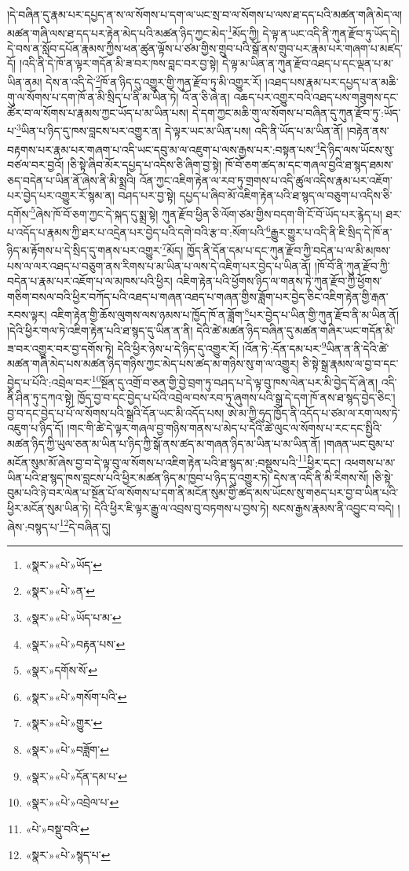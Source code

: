 །དེ་བཞིན་དུ་རྣམ་པར་དཔྱད་ན་ས་ལ་སོགས་པ་དག་ལ་ཡང་སྲ་བ་ལ་སོགས་པ་ལས་ཐ་དད་པའི་མཚན་གཞི་མེད་ལ། མཚན་གཞི་ལས་ཐ་དད་པར་རྟེན་མེད་པའི་མཚན་ཉིད་ཀྱང་མེད་\footnote{«སྣར་»«པེ་»ཡོད་}མོད་ཀྱི། དེ་ལྟ་ན་ཡང་འདི་ནི་ཀུན་རྫོབ་ཏུ་ཡོད་དེ། དེ་བས་ན་སློབ་དཔོན་རྣམས་ཀྱིས་ཕན་ཚུན་ལྟོས་པ་ཙམ་གྱིས་གྲུབ་པའི་སྒོ་ནས་གྲུབ་པར་རྣམ་པར་གཞག་པ་མཛད་དོ། །འདི་ནི་དེ་ཁོ་ན་ལྟར་གདོན་མི་ཟ་བར་ཁས་བླང་བར་བྱ་སྟེ། དེ་ལྟ་མ་ཡིན་ན་ཀུན་རྫོབ་འཐད་པ་དང་ལྡན་པ་མ་ཡིན་ནམ། དེས་ན་འདི་དེ་\footnote{«སྣར་»«པེ་»ན་}ཁོ་ན་ཉིད་དུ་འགྱུར་གྱི་ཀུན་རྫོབ་ཏུ་མི་འགྱུར་རོ། །འཐད་པས་རྣམ་པར་དཔྱད་པ་ན་མཆི་གུ་ལ་སོགས་པ་དག་ཁོ་ན་མི་སྲིད་པ་ནི་མ་ཡིན་ཏེ། འོ་ན་ཅི་ཞེ་ན། འཆད་པར་འགྱུར་བའི་འཐད་པས་གཟུགས་དང་ཚོར་བ་ལ་སོགས་པ་རྣམས་ཀྱང་ཡོད་པ་མ་ཡིན་པས། དེ་དག་ཀྱང་མཆི་གུ་ལ་སོགས་པ་བཞིན་དུ་ཀུན་རྫོབ་ཏུ་:ཡོད་པ་\footnote{«སྣར་»«པེ་»ཡོད་པ་མ་}ཡིན་པ་ཉིད་དུ་ཁས་བླངས་པར་འགྱུར་ན། དེ་ལྟར་ཡང་མ་ཡིན་པས། འདི་ནི་ཡོད་པ་མ་ཡིན་ནོ། །བརྟེན་ནས་བརྟགས་པར་རྣམ་པར་གཞག་པ་འདི་ཡང་དབུ་མ་ལ་འཇུག་པ་ལས་རྒྱས་པར་:བསྟན་པས་\footnote{«སྣར་»«པེ་»བརྟན་པས་}དེ་ཉིད་ལས་ཡོངས་སུ་བཙལ་བར་བྱའོ། །ཅི་སྟེ་ཞིབ་མོར་དཔྱད་པ་འདིས་ཅི་ཞིག་བྱ་སྟེ། ཁོ་བོ་ཅག་ཚད་མ་དང་གཞལ་བྱའི་ཐ་སྙད་ཐམས་ཅད་བདེན་པ་ཡིན་ནོ་ཞེས་ནི་མི་སྨྲའི། འོན་ཀྱང་འཇིག་རྟེན་ལ་རབ་ཏུ་གྲགས་པ་འདི་ཚུལ་འདིས་རྣམ་པར་འཇོག་པར་བྱེད་པར་འགྱུར་རོ་སྙམ་ན། བཤད་པར་བྱ་སྟེ། དཔྱད་པ་ཞིབ་མོ་འཇིག་རྟེན་པའི་ཐ་སྙད་ལ་བཅུག་པ་འདིས་ཅི་དགོས་\footnote{«སྣར་»དགོས་སོ་}ཞེས་ཁོ་བོ་ཅག་ཀྱང་དེ་སྐད་དུ་སྨྲ་སྟེ། ཀུན་རྫོབ་ཕྱིན་ཅི་ལོག་ཙམ་གྱིས་བདག་གི་ངོ་བོ་ཡོད་པར་རྙེད་པ། ཐར་པ་འདོད་པ་རྣམས་ཀྱི་ཐར་པ་འདྲེན་པར་བྱེད་པའི་དགེ་བའི་རྩ་བ་:སོག་པའི་\footnote{«སྣར་»«པེ་»གསོག་པའི་}རྒྱུར་གྱུར་པ་འདི་ནི་ཇི་སྲིད་དེ་ཁོ་ན་ཉིད་མ་རྟོགས་པ་དེ་སྲིད་དུ་གནས་པར་འགྱུར་\footnote{«སྣར་»«པེ་»གྱུར་}མོད། ཁྱོད་ནི་དོན་དམ་པ་དང་ཀུན་རྫོབ་ཀྱི་བདེན་པ་ལ་མི་མཁས་པས་ལ་ལར་འཐད་པ་བཅུག་ནས་རིགས་པ་མ་ཡིན་པ་ལས་དེ་འཇིག་པར་བྱེད་པ་ཡིན་ནོ། །ཁོ་བོ་ནི་ཀུན་རྫོབ་ཀྱི་བདེན་པ་རྣམ་པར་འཇོག་པ་ལ་མཁས་པའི་ཕྱིར། འཇིག་རྟེན་པའི་ཕྱོགས་ཉིད་ལ་གནས་ཏེ་ཀུན་རྫོབ་ཀྱི་ཕྱོགས་གཅིག་བསལ་བའི་ཕྱིར་བཀོད་པའི་འཐད་པ་གཞན་འཐད་པ་གཞན་གྱིས་ཟློག་པར་བྱེད་ཅིང་འཇིག་རྟེན་གྱི་རྒན་རབས་ལྟར། འཇིག་རྟེན་གྱི་ཆོས་ལུགས་ལས་ཉམས་པ་ཁྱོད་ཁོ་ན་ཟློག་\footnote{«སྣར་»«པེ་»བཟློག་}པར་བྱེད་པ་ཡིན་གྱི་ཀུན་རྫོབ་ནི་མ་ཡིན་ནོ། །དེའི་ཕྱིར་གལ་ཏེ་འཇིག་རྟེན་པའི་ཐ་སྙད་དུ་ཡིན་ན་ནི། དེའི་ཚེ་མཚན་ཉིད་བཞིན་དུ་མཚན་གཞིར་ཡང་གདོན་མི་ཟ་བར་འགྱུར་བར་བྱ་དགོས་ཏེ། དེའི་ཕྱིར་ཉེས་པ་དེ་ཉིད་དུ་འགྱུར་རོ། །འོན་ཏེ་:དོན་དམ་པར་\footnote{«སྣར་»«པེ་»དོན་དམ་པ་}ཡིན་ན་ནི་དེའི་ཚེ་མཚན་གཞི་མེད་པས་མཚན་ཉིད་གཉིས་ཀྱང་མེད་པས་ཚད་མ་གཉིས་སུ་ག་ལ་འགྱུར། ཅི་སྟེ་སྒྲ་རྣམས་ལ་བྱ་བ་དང་བྱེད་པ་པོའི་:འབྲེལ་བར་\footnote{«སྣར་»«པེ་»འབྲེལ་པ་}སྔོན་དུ་འགྲོ་བ་ཅན་གྱི་བྱེ་བྲག་ཏུ་བཤད་པ་དེ་ལྟ་བུ་ཁས་ལེན་པར་མི་བྱེད་དོ་ཞེ་ན། འདི་ནི་ཤིན་ཏུ་དཀའ་སྟེ། ཁྱོད་བྱ་བ་དང་བྱེད་པ་པོའི་འབྲེལ་བས་རབ་ཏུ་ཞུགས་པའི་སྒྲ་དེ་དག་ཁོ་ནས་ཐ་སྙད་བྱེད་ཅིང་། བྱ་བ་དང་བྱེད་པ་པོ་ལ་སོགས་པའི་སྒྲའི་དོན་ཡང་མི་འདོད་པས། ཨེ་མ་ཀྱི་ཧུད་ཁྱོད་ནི་འདོད་པ་ཙམ་ལ་རག་ལས་ཏེ་འཇུག་པ་ཉིད་དོ། །གང་གི་ཚེ་དེ་ལྟར་གཞལ་བྱ་གཉིས་གནས་པ་མེད་པ་དེའི་ཚེ་ལུང་ལ་སོགས་པ་རང་དང་སྤྱིའི་མཚན་ཉིད་ཀྱི་ཡུལ་ཅན་མ་ཡིན་པ་ཉིད་ཀྱི་སྒོ་ནས་ཚད་མ་གཞན་ཉིད་མ་ཡིན་པ་མ་ཡིན་ནོ། །གཞན་ཡང་བུམ་པ་མངོན་སུམ་མོ་ཞེས་བྱ་བ་དེ་ལྟ་བུ་ལ་སོགས་པ་འཇིག་རྟེན་པའི་ཐ་སྙད་མ་:བསྡུས་པའི་\footnote{«པེ་»བསྡུ་བའི་}ཕྱིར་དང་། འཕགས་པ་མ་ཡིན་པའི་ཐ་སྙད་ཁས་བླངས་པའི་ཕྱིར་མཚན་ཉིད་མ་ཁྱབ་པ་ཉིད་དུ་འགྱུར་ཏེ། དེས་ན་འདི་ནི་མི་རིགས་སོ། །ཅི་སྟེ་བུམ་པའི་ཉེ་བར་ལེན་པ་སྔོན་པོ་ལ་སོགས་པ་དག་ནི་མངོན་སུམ་གྱི་ཚད་མས་ཡོངས་སུ་གཅད་པར་བྱ་བ་ཡིན་པའི་ཕྱིར་མངོན་སུམ་ཡིན་ཏེ། དེའི་ཕྱིར་ཇི་ལྟར་རྒྱུ་ལ་འབྲས་བུ་བཏགས་པ་བྱས་ཏེ། སངས་རྒྱས་རྣམས་ནི་འབྱུང་བ་བདེ། །ཞེས་:བསྙད་པ་\footnote{«སྣར་»«པེ་»སྙད་པ་}དེ་བཞིན་དུ། 
